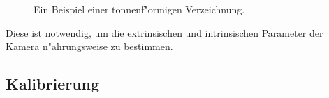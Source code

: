 \documentclass[arbeit=studie,oneside,BCOR=12mm]{ArbeitRST}
\begin{document}
\begin{figure}[h]
    \centering
    \caption{Ein Beispiel einer tonnenf"ormigen Verzeichnung.}
    \label{barrel}
\end{figure}

Diese ist notwendig, um die extrinsischen und intrinsischen
Parameter der Kamera n"ahrungsweise zu bestimmen. 

\subsection{Kalibrierung}
\end{document}
